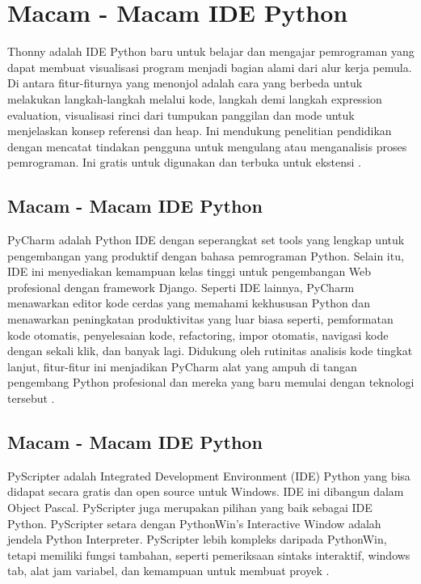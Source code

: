 \section{Macam - Macam IDE Python}
Thonny adalah IDE Python baru untuk belajar dan mengajar pemrograman yang dapat membuat visualisasi program menjadi bagian alami dari alur kerja pemula.
Di antara fitur-fiturnya yang menonjol adalah cara yang berbeda untuk melakukan langkah-langkah melalui kode, langkah demi langkah expression evaluation, visualisasi rinci dari tumpukan panggilan dan mode untuk menjelaskan konsep referensi dan heap. Ini mendukung penelitian pendidikan dengan mencatat tindakan pengguna untuk mengulang atau menganalisis proses pemrograman. Ini gratis untuk digunakan dan terbuka untuk ekstensi \cite{annamaa2015introducing}.

\subsection{Macam - Macam IDE Python}
PyCharm adalah Python IDE dengan seperangkat set tools yang lengkap untuk pengembangan yang produktif dengan bahasa pemrograman Python. Selain itu, IDE ini menyediakan kemampuan kelas tinggi untuk pengembangan Web profesional dengan framework Django. Seperti IDE lainnya, PyCharm menawarkan editor kode cerdas yang memahami kekhususan Python dan menawarkan peningkatan produktivitas yang luar biasa seperti, pemformatan kode otomatis, penyelesaian kode, refactoring, impor otomatis, navigasi kode dengan sekali klik, dan banyak lagi. Didukung oleh rutinitas analisis kode tingkat lanjut, fitur-fitur ini menjadikan PyCharm alat yang ampuh di tangan pengembang Python profesional dan mereka yang baru memulai dengan teknologi tersebut \cite{fifli2016pirhoogammarhoalphamumualpha}.

\subsection{Macam - Macam IDE Python}
PyScripter adalah Integrated Development Environment (IDE) Python yang bisa didapat secara gratis  dan open source untuk Windows. IDE ini dibangun dalam Object Pascal. PyScripter juga merupakan pilihan yang baik sebagai IDE Python. PyScripter setara dengan PythonWin’s Interactive Window adalah jendela Python Interpreter. PyScripter lebih kompleks daripada PythonWin, tetapi memiliki fungsi tambahan, seperti pemeriksaan sintaks interaktif, windows tab, alat jam variabel, dan kemampuan untuk membuat proyek \cite{tateosian2015beginning}.

